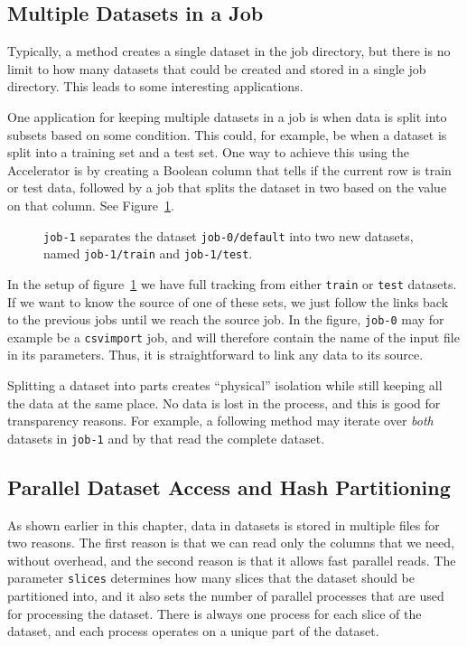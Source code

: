 \subsection{Multiple Datasets in a Job}

Typically, a method creates a single dataset in the job directory, but
there is no limit to how many datasets that could be created and
stored in a single job directory.  This leads to some interesting
applications.

One application for keeping multiple datasets in a job is when data is
split into subsets based on some condition.  This could, for example,
be when a dataset is split into a training set and a test set.  One
way to achieve this using the Accelerator is by creating a Boolean
column that tells if the current row is train or test data, followed
by a job that splits the dataset in two based on the value on that
column.  See Figure~\ref{fig:dep_dataset_csvimport_chain}.

\begin{figure}[h!]
  \hspace{1cm}
  
  \caption{\texttt{job-1} separates the dataset
    \texttt{job-0/default} into two new datasets, named
    \texttt{job-1/train} and \texttt{job-1/test}.}
  \label{fig:dep_dataset_csvimport_chain}
\end{figure}

In the setup of figure~\ref{fig:dep_dataset_csvimport_chain} we have
full tracking from either \texttt{train} or \texttt{test} datasets.
If we want to know the source of one of these sets, we just follow the
links back to the previous jobs until we reach the source job.  In the
figure, \texttt{job-0} may for example be a \texttt{csvimport} job,
and will therefore contain the name of the input file in its
parameters.  Thus, it is straightforward to link any data to its
source.

Splitting a dataset into parts creates ``physical'' isolation while
still keeping all the data at the same place.  No data is lost in the
process, and this is good for transparency reasons.  For example, a
following method may iterate over \textsl{both} datasets in
\texttt{job-1} and by that read the complete dataset.



\subsection{Parallel Dataset Access and Hash Partitioning}
As shown earlier in this chapter, data in datasets is stored in
multiple files for two reasons.  The first reason is that we can read
only the columns that we need, without overhead, and the second reason
is that it allows fast parallel reads.  The parameter \texttt{slices}
determines how many slices that the dataset should be partitioned
into, and it also sets the number of parallel processes that are used for
processing the dataset.  There is always one process for each slice of
the dataset, and each process operates on a unique part of the
dataset.

